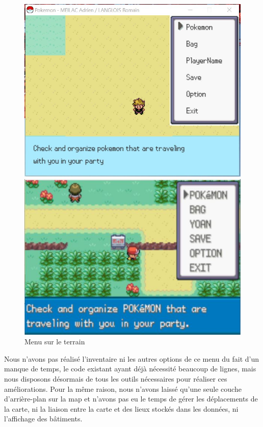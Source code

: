 \documentclass[a4paper,twoside, openany,11pt]{book}
\begin{document}
\begin{figure}[!h]
\begin{minipage}{0.49\textwidth}
\includegraphics[scale = 0.6]{Images/fieldMenu.jpg}
\end{minipage}
\begin{minipage}{0.49\textwidth}
\includegraphics[scale = 0.84]{Images/vrai_jeu_fieldMenu.jpg}
\end{minipage}
\caption{Menu sur le terrain}
\end{figure}

Nous n'avons pas réalisé l'inventaire ni les autres options de ce menu du fait d'un manque de temps, le code existant ayant déjà nécessité beaucoup de lignes, mais nous disposons désormais de tous les outils nécessaires pour réaliser ces améliorations. Pour la même raison, nous n'avons laissé qu'une seule couche d'arrière-plan sur la map et n'avons pas eu le temps de gérer les déplacements de la carte, ni la liaison entre la carte et des lieux stockés dans les données, ni l'affichage des bâtiments.
\end{document}
